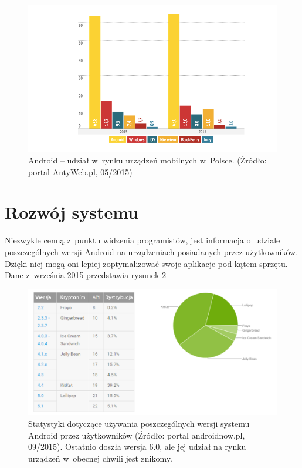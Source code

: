 \begin{figure}[!htb]
    \centering
    \includegraphics[width=15cm]{imgs/ch2_android_udzial_1.png}
    \caption
{Android – udział w~rynku urządzeń mobilnych w~Polsce. (Źródło: portal AntyWeb.pl, 05/2015)}
    \label{fig:android_udzial_polska}
\end{figure} 

\newpage

\section{Rozwój systemu}
Niezwykle cenną z~punktu widzenia programistów, jest informacja o~udziale poszczególnych wersji Android na urządzeniach posiadanych przez użytkowników. Dzięki niej mogą oni lepiej zoptymalizować swoje aplikacje pod kątem sprzętu. Dane z~września 2015 przedstawia rysunek \ref{fig:android_udzial_wersje}

\begin{figure}[!htb]
    \centering
    \includegraphics[width=17cm]{imgs/ch2_android_udzial_3pl.png}
    \caption
{Statystyki dotyczące używania poszczególnych wersji systemu Android przez użytkowników (Źródło: portal androidnow.pl, 09/2015). Ostatnio doszła wersja 6.0, ale jej udział na rynku urządzeń w~obecnej chwili jest znikomy.}
    \label{fig:android_udzial_wersje}
\end{figure} 

